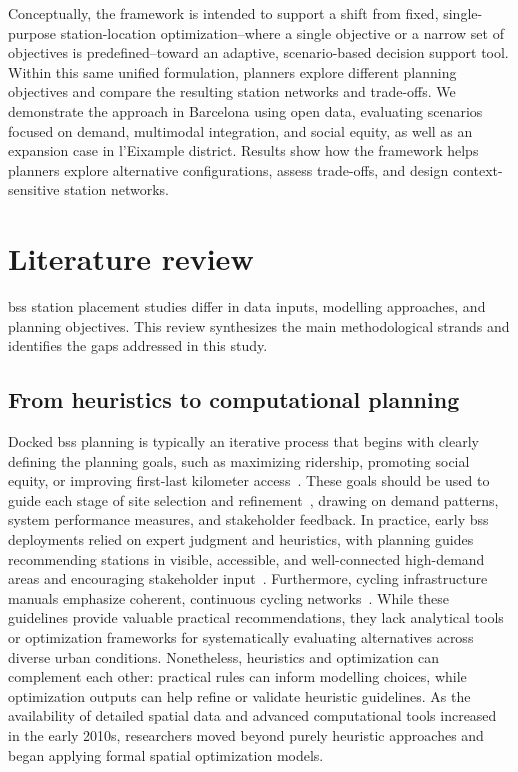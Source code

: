 Conceptually, the framework is intended to support a shift from fixed, single-purpose station-location optimization--where a single objective or a narrow set of objectives is predefined--toward an adaptive, scenario-based decision support tool. Within this same unified formulation, planners explore different planning objectives and compare the resulting station networks and trade-offs. We demonstrate the approach in Barcelona using open data, evaluating scenarios focused on demand, multimodal integration, and social equity, as well as an expansion case in l'Eixample district. Results show how the framework helps planners explore alternative configurations, assess trade-offs, and design context-sensitive station networks.

\section{Literature review} \label{sec:lit_review}

\ac{bss} station placement studies differ in data inputs, modelling approaches, and planning objectives. This review synthesizes the main methodological strands and identifies the gaps addressed in this study.


\subsection{From heuristics to computational planning}

Docked \ac{bss} planning is typically an iterative process that begins with clearly defining the planning goals, such as maximizing ridership, promoting social equity, or improving first-last kilometer access~\cite{Duran-Rodas2021, Ferrando2007, Yanocha2018}. These goals should be used to guide each stage of site selection and refinement~\cite{Ferrando2007, Yanocha2018}, drawing on demand patterns, system performance measures, and stakeholder feedback. In practice, early \ac{bss} deployments relied on expert judgment and heuristics, with planning guides recommending stations in visible, accessible, and well-connected high-demand areas and encouraging stakeholder input~\cite{Ferrando2007, Yanocha2018, CROW2006}. Furthermore, cycling infrastructure manuals emphasize coherent, continuous cycling networks~\cite{AASHTO1999bicycle, CROW2006}. While these guidelines provide valuable practical recommendations, they lack analytical tools or optimization frameworks for systematically evaluating alternatives across diverse urban conditions. Nonetheless, heuristics and optimization can complement each other: practical rules can inform modelling choices, while optimization outputs can help refine or validate heuristic guidelines. As the availability of detailed spatial data and advanced computational tools increased in the early 2010s, researchers moved beyond purely heuristic approaches and began applying formal spatial optimization models.


